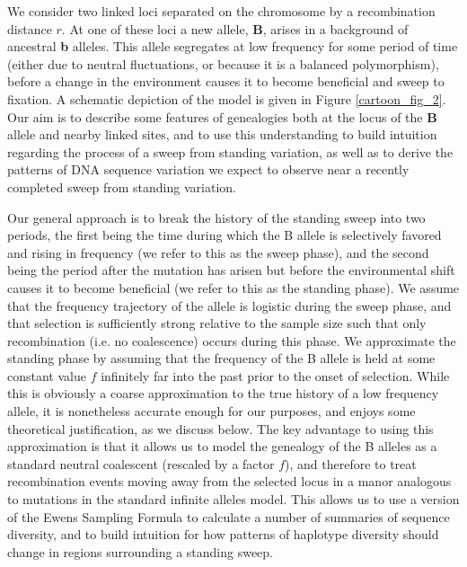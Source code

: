 \documentclass[a4paper,10pt]{article}
\newcommand{\jb}[1]{{\it\color{blue} (#1)} }
\begin{document}
We consider two linked loci separated on the chromosome by a recombination distance $r$. At one of these loci a new allele, \textbf{B}, arises in a background of ancestral \textbf{b} alleles. This allele segregates at low frequency for some period of time (either due to neutral fluctuations, or because it is a balanced polymorphism), before a change in the environment causes it to become beneficial and sweep to fixation. A schematic depiction of the model is given in Figure \ref{cartoon_fig_2}. Our aim is to describe some features of genealogies both at the locus of the \textbf{B} allele and nearby linked sites, and to use this understanding to build intuition regarding the process of a sweep from standing variation, as well as to derive the patterns of DNA sequence variation we expect to observe near a recently completed sweep from standing variation.

Our general approach is to break the history of the standing sweep into two periods, the first being the time during which the B allele is selectively favored and rising in frequency (we refer to this as the sweep phase), and the second being the period after the mutation has arisen but before the environmental shift causes it to become beneficial (we refer to this as the standing phase). We assume that the frequency trajectory of the allele is logistic during the sweep phase, and that selection is sufficiently strong relative to the sample size such that only recombination (i.e. no coalescence) occurs during this phase. We approximate the standing phase by assuming that the frequency of the B allele is held at some constant value $f$ infinitely far into the past prior to the onset of selection. While this is obviously a coarse approximation to the true history of a low frequency allele, it is nonetheless accurate enough for our purposes, and enjoys some theoretical justification, as we discuss below. The key advantage to using this approximation is that it allows us to model the genealogy of the B alleles as a standard neutral coalescent (rescaled by a factor $f$), and therefore to treat recombination events moving away from the selected locus in a manor analogous to mutations in the standard infinite alleles model. This allows us to use a version of the Ewens Sampling Formula to calculate a number of summaries of sequence diversity, and to build intuition for how patterns of haplotype diversity should change in regions surrounding a standing sweep.

\end{document}
